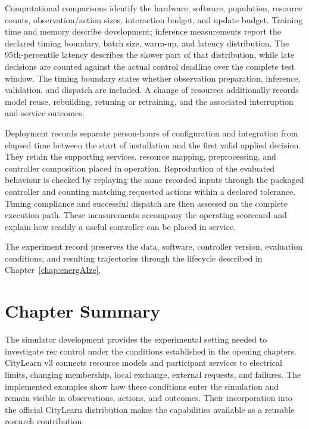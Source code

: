 Computational comparisons identify the hardware, software, population, resource counts, observation/action sizes, interaction budget, and update budget. Training time and memory describe development; inference measurements report the declared timing boundary, batch size, warm-up, and latency distribution. The 95th-percentile latency describes the slower part of that distribution, while late decisions are counted against the actual control deadline over the complete test window. The timing boundary states whether observation preparation, inference, validation, and dispatch are included. A change of resources additionally records model reuse, rebuilding, retuning or retraining, and the associated interruption and service outcomes.

Deployment records separate person-hours of configuration and integration from elapsed time between the start of installation and the first valid applied decision. They retain the supporting services, resource mapping, preprocessing, and controller composition placed in operation. Reproduction of the evaluated behaviour is checked by replaying the same recorded inputs through the packaged controller and counting matching requested actions within a declared tolerance. Timing compliance and successful dispatch are then assessed on the complete execution path. These measurements accompany the operating scorecard and explain how readily a useful controller can be placed in service.

The experiment record preserves the data, software, controller version, evaluation conditions, and resulting trajectories through the lifecycle described in Chapter~\ref{chap:energAIze}.

\section{Chapter Summary}
\label{sec:sim-discussion}
\label{sec:sim-open}

The simulator development provides the experimental setting needed to investigate \gls{rec} control under the conditions established in the opening chapters. CityLearn v3 connects resource models and participant services to electrical limits, changing membership, local exchange, external requests, and failures. The implemented examples show how these conditions enter the simulation and remain visible in observations, actions, and outcomes. Their incorporation into the official CityLearn distribution makes the capabilities available as a reusable research contribution.

